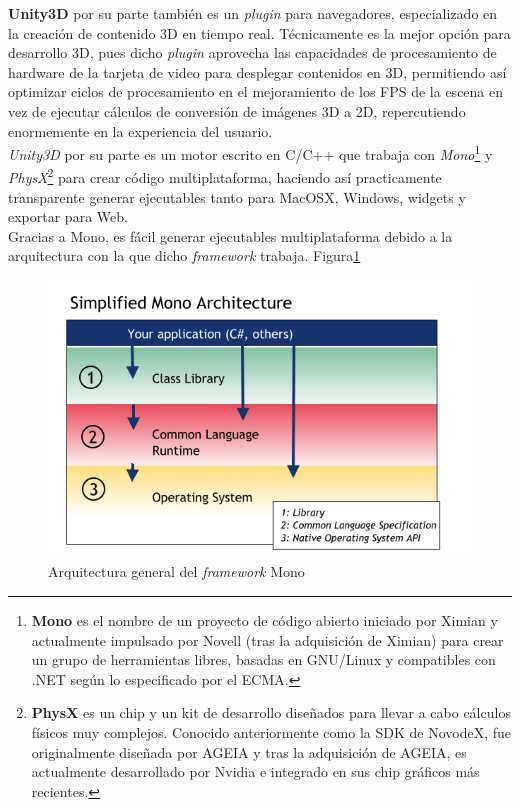 \textbf{Unity3D} por su parte también es un \emph{plugin} para navegadores, especializado en la creación de contenido 3D en tiempo real. Técnicamente es la mejor opción para desarrollo 3D, pues dicho \emph{plugin} aprovecha las capacidades de procesamiento de hardware de la tarjeta de video para desplegar contenidos en 3D, permitiendo así optimizar ciclos de procesamiento en el mejoramiento de los FPS de la escena en vez de ejecutar cálculos de conversión de imágenes 3D a 2D, repercutiendo enormemente en la experiencia del usuario.\\

\emph{Unity3D} por su parte es un motor escrito en C/C++ que trabaja con \emph{Mono}\footnote{\textbf{Mono} es el nombre de un proyecto de código abierto iniciado por Ximian y actualmente impulsado por Novell (tras la adquisición de Ximian) para crear un grupo de herramientas libres, basadas en GNU/Linux y compatibles con .NET según lo especificado por el ECMA.} y \emph{PhysX}\footnote{\textbf{PhysX} es un chip y un kit de desarrollo diseñados para llevar a cabo cálculos físicos muy complejos. Conocido anteriormente como la SDK de NovodeX, fue originalmente diseñada por AGEIA y tras la adquisición de AGEIA, es actualmente desarrollado por Nvidia e integrado en sus chip gráficos más recientes.} para crear código multiplataforma, haciendo así practicamente transparente generar ejecutables tanto para MacOSX, Windows, widgets y exportar para Web.\\

Gracias a Mono, es fácil generar ejecutables multiplataforma debido a la arquitectura con la que dicho \emph{framework} trabaja. Figura\ref{fig:mono}\\

\begin{figure}[h]
	\centering
		\includegraphics[scale=0.6]{Mono.PNG}
		\caption{Arquitectura general del \emph{framework} Mono}
	\label{fig:mono}
\end{figure}


